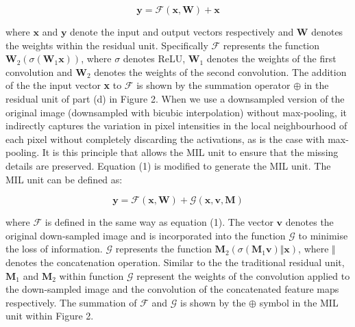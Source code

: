 \documentclass[3p]{elsarticle}
\begin{document}
\begin{equation}
\textbf{y} = \mathcal{F}(\textbf{x} , {\textbf{W}}) + \textbf{x}
\end{equation}

\noindent where $\textbf{x}$ and $\textbf{y}$ denote the input and output vectors respectively and $\textbf{W}$ denotes the weights within the residual unit. Specifically $\mathcal{F}$ represents the function $\textbf{W}_2(\sigma(\textbf{W}_1\textbf{x}))$, where $\sigma$ denotes ReLU, $\textbf{W}_1$ denotes the weights of the first convolution and $\textbf{W}_2$ denotes the weights of the second convolution. The addition of the the input vector \textbf{x} to $\mathcal{F}$ is shown by the summation operator $\oplus$ in the residual unit of part (d) in Figure 2. When we use a downsampled version of the original image (downsampled with bicubic interpolation) without max-pooling, it indirectly captures the variation in pixel intensities in the local neighbourhood of each pixel without completely discarding the activations, as is the case with max-pooling. It is this principle that allows the MIL unit to ensure that the missing details are preserved. Equation (1) is modified to generate the MIL unit. The MIL unit can be defined as:

\begin{equation}
\textbf{y} = \mathcal{F}(\textbf{x} , {\textbf{W}}) + \mathcal{G}(\textbf{x} , \textbf{v}, {\textbf{M}})
\end{equation}

\noindent where $\mathcal{F}$ is defined in the same way as equation (1). The vector $\textbf{v}$ denotes the original down-sampled image and is incorporated into the function $\mathcal{G}$ to minimise the loss of information. $\mathcal{G}$ represents the function  $\textbf{M}_2(\sigma(\textbf{M}_1\textbf{v}) \Vert \textbf{x})$, where $\Vert$ denotes the concatenation operation. Similar to the the traditional residual unit,  $\textbf{M}_1$ and $\textbf{M}_2$ within function $\mathcal{G}$ represent the weights of the convolution applied to the down-sampled image and the convolution of the concatenated feature maps respectively. The summation of $\mathcal{F}$ and $\mathcal{G}$ is shown by the  $\oplus$ symbol in the MIL unit within Figure 2.
\end{document}
